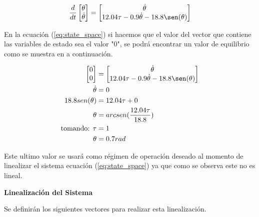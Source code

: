 \documentclass[12pt]{article}
\begin{document}
\begin{equation}
    \frac{d}{dt}
    \begin{bmatrix}
        \theta  \\
        \dot{\theta} \\ 
    \end{bmatrix}=\begin{bmatrix}
        \dot{\theta}  \\
        12.04\tau-0.9\dot{\theta}-18.8\sen(\theta) \\ 
    \end{bmatrix}
    \label{eq:state_space}
\end{equation}

En la ecuación (\ref{eq:state_space}) si hacemos que el valor del vector que contiene las variables de estado sea el valor "$0$", se podrá encontrar un valor de equilibrio como se muestra en a continuación.

\begin{equation}
    \begin{split}
        \begin{bmatrix}
            0  \\
            0  \\ 
        \end{bmatrix}&=\begin{bmatrix}
            \dot{\theta}  \\
            12.04\tau-0.9\dot{\theta}-18.8\sen(\theta) \\ 
        \end{bmatrix}\\
        \dot{\theta}&=0\\
        18.8sen(\theta)&=12.04\tau+0\\
        \theta&=arcsen(\frac{12.04\tau}{18.8})\\
        \text{tomando: } \tau&=1 \\
        \theta&=0.7rad\\
    \end{split}
    \label{eq:equilibrium}
\end{equation}

Este ultimo valor se usará como régimen de operación deseado al momento de linealizar el sistema ecuación  (\ref{eq:state_space}) ya que como se observa este no es lineal.

\textbf{Linealización del Sistema}

Se definirán los siguientes vectores para realizar esta linealización.
\end{document}
